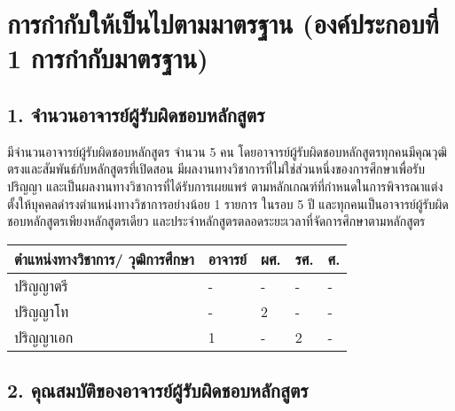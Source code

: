 {\cleardoublepage
\section{การกำกับให้เป็นไปตามมาตรฐาน (องค์ประกอบที่ 1 การกำกับมาตรฐาน)}

\subsection*{1. จำนวนอาจารย์ผู้รับผิดชอบหลักสูตร}

\printprogram{} มีจำนวนอาจารย์ผู้รับผิดชอบหลักสูตร จำนวน 5 คน โดยอาจารย์ผู้รับผิดชอบหลักสูตรทุกคนมีคุณวุฒิตรงและสัมพันธ์กับหลักสูตรที่เปิดสอน มีผลงานทางวิชาการที่ไม่ใช่ส่วนหนึ่งของการศึกษาเพื่อรับปริญญา และเป็นผลงานทางวิชาการที่ได้รับการเผยแพร่ ตามหลักเกณฑ์ที่กำหนดในการพิจารณาแต่งตั้งให้บุคคลดำรงตำแหน่งทางวิชาการอย่างน้อย 1 รายการ ในรอบ 5 ปี และทุกคนเป็นอาจารย์ผู้รับผิดชอบหลักสูตรเพียงหลักสูตรเดียว และประจำหลักสูตรตลอดระยะเวลาที่จัดการศึกษาตามหลักสูตร

\begin{center}
\begin{tabular}{|P{0.4\textwidth}|P{0.1\textwidth}|P{0.1\textwidth}|P{0.1\textwidth}|P{0.1\textwidth}|}
\hline
ตำแหน่งทางวิชาการ/ วุฒิการศึกษา & อาจารย์ & ผศ. & รศ. & ศ. \\ \hline
ปริญญาตรี & - & - & - & - \\ \hline
ปริญญาโท  & - & 2 & - & - \\ \hline
ปริญญาเอก & 1 & - & 2 & - \\ \hline
\end{tabular}
\end{center}

\printselfeval   %

\subsection*{2. คุณสมบัติของอาจารย์ผู้รับผิดชอบหลักสูตร}

}
